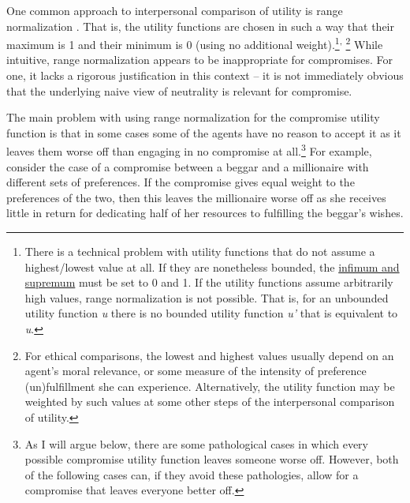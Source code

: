 One common approach to interpersonal comparison of utility is range
normalization \parencite{Isbell1959-ql,Hausman1995-ry}. That
is, the utility functions are chosen in such a way that their maximum is
1 and their minimum is 0 (using no additional weight).\footnote{There is
  a technical problem with utility functions that do not assume a
  highest/lowest value at all. If they are nonetheless bounded, the
  \href{https://en.wikipedia.org/wiki/Infimum_and_supremum}{infimum
  and supremum} must be set to 0 and 1. If the utility functions assume
  arbitrarily high values, range normalization is not possible. That is,
  for an unbounded utility function \emph{u} there is no bounded utility
  function \emph{u'} that is equivalent to \emph{u}.}\textsuperscript{, }\footnote{For
  ethical comparisons, the lowest and highest values usually depend on
  an agent's moral relevance, or some measure of the intensity of
  preference (un)fulfillment she can experience. Alternatively, the
  utility function may be weighted by such values at some other steps of
  the interpersonal comparison of utility.} While intuitive, range
normalization appears to be inappropriate for compromises. For one, it
lacks a rigorous justification in this context -- it is not immediately
obvious that the underlying naive view of neutrality is relevant for
compromise.

The main problem with using range normalization for the compromise
utility function is that in some cases some of the agents have no reason
to accept it as it leaves them worse off than engaging in no compromise
at all.\footnote{As I will argue below, there are some pathological
  cases in which every possible compromise utility function leaves
  someone worse off. However, both of the following cases can, if they
  avoid these pathologies, allow for a compromise that leaves everyone
  better off.} For example, consider the case of a compromise between a
beggar and a millionaire with different sets of preferences. If the
compromise gives equal weight to the preferences of the two, then this
leaves the millionaire worse off as she receives little in return for
dedicating half of her resources to fulfilling the beggar's wishes.

